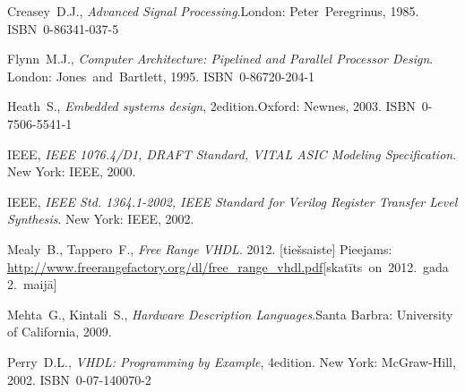 \documentclass[12pt,a4paper]{article} %
\begin{document}
	
	\clearpage
	{\raggedright
	\begin{thebibliography}{9}
			Creasey~D.J.,
			\textit{Advanced Signal Processing}.\linebreak[1]
			London: Peter~Peregrinus, 1985. ISBN~0-86341-037-5
		
			Flynn~M.J.,
			\textit{Computer Architecture: Pipelined and Parallel Processor Design}.
			\linebreak[3]
			London: Jones~and~Bartlett, 1995. ISBN~0-86720-204-1
		
			Heath~S.,
			\textit{Embedded systems design}, 2\nd edition.\linebreak[3]
			Oxford: Newnes, 2003. ISBN~0-7506-5541-1
		
			IEEE,
			\textit{IEEE 1076.4/D1, DRAFT Standard, VITAL ASIC Modeling Specification}.
			New York: IEEE, 2000.
		
			IEEE,
			\textit{IEEE Std. 1364.1-2002, IEEE Standard for Verilog Register Transfer Level Synthesis}.
			New York: IEEE, 2002.
		
			Mealy~B., Tappero~F.,
			\textit{Free Range VHDL}.
			2012. [tiešsaiste] \linebreak[2]
			Pieejams: \url{http://www.freerangefactory.org/dl/free_range_vhdl.pdf}\linebreak[2]
			\mbox{[skatīts on 2012.~gada 2.~maijā]}
		
			Mehta~G., Kintali~S.,
			\textit{Hardware Description Languages}.\linebreak[2]
			Santa Barbra: University of California,
			2009.
		
		
			Perry~D.L.,
			\textit{VHDL: Programming by Example}, 4\nth edition. \linebreak[2]
			New York: McGraw-Hill, 2002. ISBN~0-07-140070-2
		

\end{thebibliography}}
\end{document}
